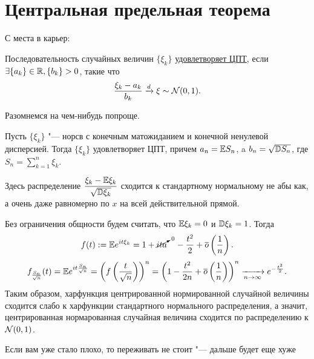 \section{Центральная предельная теорема}

С места в карьер:

\begin{Def}
    Последовательность случайных величин $\{ \xi_k \}$ \uline{удовлетворяет ЦПТ}, если $\exists \{ a_k \} \in \mathbb{R}, \{ b_k \} > 0$, такие что 
    \[
        \dfrac{\xi_k - a_k}{b_k} \xrightarrow[]{d} \xi \sim \mathcal{N}(0, 1)
    .\] 
\end{Def}

Разомнемся на чем-нибудь попроще.

\begin{Th}
    Пусть $\{ \xi_k \}$ "--- норсв с конечным матожиданием и конечной ненулевой дисперсией. Тогда $\{ \xi_k \}$ удовлетворяет ЦПТ, причем $a_n = \mathbb{E} S_n$,
    a $b_n = \sqrt{\mathbb{D} S_n}$, где  $S_n = \sum\limits_{k=1}^{n} \xi_k$.
\end{Th}

\begin{Note}
    Здесь распределение $\dfrac{\xi_k - \mathbb{E} \xi_k}{\sqrt{\mathbb{D} \xi_k}}$ сходится к стандартному нормальному не абы как, а очень даже равномерно по $x$ на всей действительной прямой.
\end{Note} 

\begin{Proof}
    Без ограничения общности будем считать, что $\mathbb{E} \xi_k = 0$ и  $\mathbb{D} \xi_k = 1$.
    Тогда 
     \[
         f(t) := \mathbb{E} e^{it\xi_k} = 1 + \cancelto{\text{\scriptsize{0}}}{ita} \quad - \dfrac{t^2}{2} + \overline{o} \left( \dfrac{1}{n} \right) 
    .\]
    \[
        f_{\frac{S_n}{\sqrt{n}}} (t) = \mathbb{E} e^{it\frac{S_n}{\sqrt{n}}} = 
        \left( f \left( \dfrac{t}{\sqrt{n}} \right) \right)^{n} = 
        \left( 1 - \dfrac{t^2}{2n} + \overline{o} \left( \dfrac{1}{n} \right)  \right)^{n} 
        \xrightarrow[n \rightarrow \infty]{} e^{-\frac{t^2}{2}}
    .\] 
    Таким образом, харфункция центрированной нормированной случайной величины сходится слабо к харфункции стандартного нормального распределения, а значит, центрированная нормарованная случайная величина сходится по распределению к $\mathcal{N}(0, 1)$.
\end{Proof} 

\begin{Why}
    Если вам уже стало плохо, то переживать не стоит "--- дальше будет еще хуже
\end{Why} 

